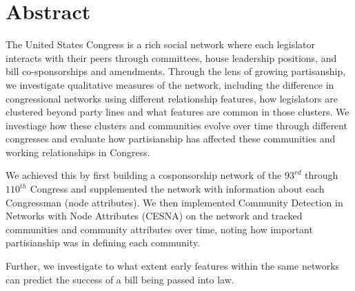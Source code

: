 \section{Abstract}

The United States Congress is a rich social network where each legislator
interacts with their peers through committees, house leadership positions, and
bill co-sponsorships and amendments. Through the lens of growing partisanship,
we investigate qualitative measures of the network, including the difference in
congressional networks using different relationship features, how legislators
are clustered beyond party lines and what features are common in those clusters.
We investiage how these clusters and communities evolve over time through
different congresses and evaluate how partisianship has affected these
communities and working relationships in Congress.

We achieved this by first building a cosponsorship network of the $93^{rd}$
through $110^{th}$ Congress and supplemented the network with information about
each Congressman (node attributes). We then implemented Community Detection in
Networks with Node Attributes (CESNA) on the network and tracked communities and
community attributes over time, noting how important partisianship was in
defining each community.

Further, we investigate to what extent early features within the same networks
can predict the success of a bill being passed into law.
